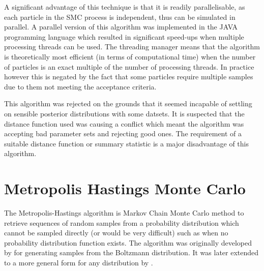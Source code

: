 A significant advantage of this technique is that it is readily parallelisable, as each particle in the SMC process is independent, thus can be simulated in parallel. A parallel version of this algorithm was implemented in the JAVA programming language which resulted in significant speed-ups when multiple processing threads can be used. The threading manager means that the algorithm is theoretically most efficient (in terms of computational time) when the number of particles is an exact multiple of the number of processing threads. In practice however this is negated by the fact that some particles require multiple samples due to them not meeting the acceptance criteria.


This algorithm was rejected on the grounds that it seemed incapable of settling on sensible posterior distributions with some datsets. It is suspected that the distance function used was causing a conflict which meant the algorithm was accepting bad parameter sets and rejecting good ones. The requirement of a suitable distance function or summary statistic is a major disadvantage of this algorithm.

\section{Metropolis Hastings Monte Carlo}

The Metropolis-Hastings algorithm is Markov Chain Monte Carlo method to retrieve sequences of random samples from a probability distribution which cannot be sampled directly (or would be very difficult) such as when no probability distribution function exists. The algorithm was originally developed by \citet{Metropolis1953} for generating samples from the Boltzmann distribution. It was later extended to a more general form for any distribution by \citet{Hastings1970}.

